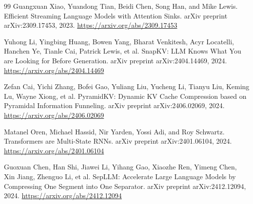 \documentclass[11pt]{article}
\begin{document}
\begin{thebibliography}{99}
Guangxuan Xiao, Yuandong Tian, Beidi Chen, Song Han, and Mike Lewis.
\newblock Efficient Streaming Language Models with Attention Sinks.
\newblock arXiv preprint arXiv:2309.17453, 2023. \url{https://arxiv.org/abs/2309.17453}

Yuhong Li, Yingbing Huang, Bowen Yang, Bharat Venkitesh, Acyr Locatelli, Hanchen Ye, Tianle Cai, Patrick Lewis, et al.
\newblock SnapKV: LLM Knows What You are Looking for Before Generation.
\newblock arXiv preprint arXiv:2404.14469, 2024. \url{https://arxiv.org/abs/2404.14469}

Zefan Cai, Yichi Zhang, Bofei Gao, Yuliang Liu, Yucheng Li, Tianyu Liu, Keming Lu, Wayne Xiong, et al.
\newblock PyramidKV: Dynamic KV Cache Compression based on Pyramidal Information Funneling.
\newblock arXiv preprint arXiv:2406.02069, 2024. \url{https://arxiv.org/abs/2406.02069}

Matanel Oren, Michael Hassid, Nir Yarden, Yossi Adi, and Roy Schwartz.
\newblock Transformers are Multi-State RNNs.
\newblock arXiv preprint arXiv:2401.06104, 2024. \url{https://arxiv.org/abs/2401.06104}

Guoxuan Chen, Han Shi, Jiawei Li, Yihang Gao, Xiaozhe Ren, Yimeng Chen, Xin Jiang, Zhenguo Li, et al.
\newblock SepLLM: Accelerate Large Language Models by Compressing One Segment into One Separator.
\newblock arXiv preprint arXiv:2412.12094, 2024. \url{https://arxiv.org/abs/2412.12094}

\end{thebibliography}
\end{document}

